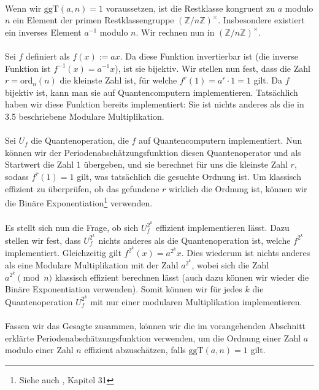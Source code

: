 \paragraph{}
Wenn wir $\text{ggT}(a, n) = 1$ voraussetzen, ist die Restklasse kongruent zu $a$ modulo $n$ ein Element der primen Restklassengruppe $(\mathbb {Z}/n\mathbb {Z} )^{\times}$. Insbesondere existiert ein inverses Element $a^{-1}$ modulo $n$. Wir rechnen nun in $(\mathbb {Z}/n\mathbb {Z})^{\times}$.
\paragraph{}
Sei $f$ definiert als $f(x) := ax$. Da diese Funktion invertierbar ist (die inverse Funktion ist $f^{-1}(x) = a^{-1}x$), ist sie bijektiv. Wir stellen nun fest, dass die Zahl $r = \text{ord}_n(n)$ die kleinste Zahl ist, für welche $f^r(1) = a^r\cdot 1 = 1$ gilt. Da $f$ bijektiv ist, kann man sie auf Quantencomputern implementieren. Tatsächlich haben wir diese Funktion bereits implementiert: Sie ist nichts anderes als die in 3.5 beschriebene Modulare Multiplikation.

\paragraph{}
Sei $U_f$ die Quantenoperation, die $f$ auf Quantencomputern implementiert. Nun können wir der Periodenabschätzungsfunktion diesen Quantenoperator und als Startwert die Zahl $1$ übergeben, und sie berechnet für uns die kleinste Zahl $r$, sodass $f^r(1) = 1$ gilt, was tatsächlich die gesuchte Ordnung ist. Um klassisch effizient zu überprüfen, ob das gefundene $r$ wirklich die Ordnung ist, können wir die Binäre Exponentiation\footnote{Siehe auch \cite{clrs}, Kapitel 31} verwenden.
\paragraph{}
Es stellt sich nun die Frage, ob sich $U_f^{2^k}$ effizient implementieren lässt. Dazu stellen wir fest, dass $U_f^{2^k}$ nichts anderes als die Quantenoperation ist, welche $f^{2^k}$ implementiert. Gleichzeitig gilt $f^{2^k}(x) = a^{2^k}x$. Dies wiederum ist nichts anderes als eine Modulare Multiplikation mit der Zahl $a^{2^k}$, wobei sich die Zahl $a^{2^k} \pmod{n}$ klassisch effizient berechnen lässt (auch dazu können wir wieder die Binäre Exponentiation verwenden). Somit können wir für jedes $k$ die Quantenoperation $U_f^{2^k}$ mit nur einer modularen Multiplikation implementieren.
\paragraph{}
Fassen wir das Gesagte zusammen, können wir die im vorangehenden Abschnitt erklärte Periodenabschätzungsfunktion verwenden, um die Ordnung einer Zahl $a$ modulo einer Zahl $n$ effizient abzuschätzen, falls $\text{ggT}(a, n) = 1$ gilt.

